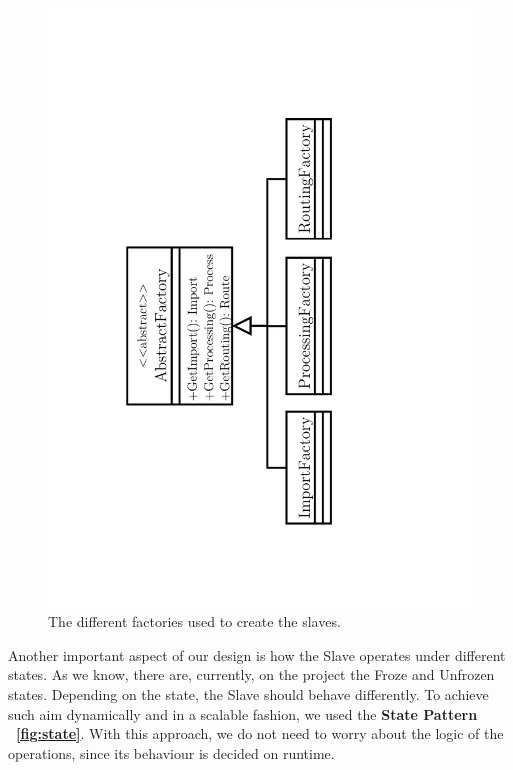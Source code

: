 \documentclass[times, 10pt,twocolumn]{article}
\begin{document}
\begin{figure}[h]
	\centering
	\includegraphics[angle=0, scale=0.35]{"Architecture/Factories"}
	\caption{The different factories used to create the slaves. } 
	\label{fig:factories}
\end{figure}

Another important aspect of our design is how the Slave operates under different states. As we know, there are, currently, on the project the Froze and Unfrozen states. Depending on the state, the Slave should behave differently. To achieve such aim dynamically and in a scalable fashion, we used the \textbf{State Pattern} \textbf{~\cref{fig:state}}. With this approach, we do not need to worry about the logic of the operations, since its behaviour is decided on runtime.
\end{document}
